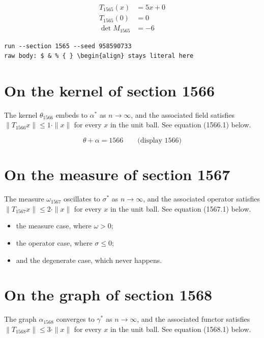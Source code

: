 \documentclass{article}
\begin{document}
\begin{align}
T_{1565}(x) &= 5 x + 0 \\
T_{1565}(0) &= 0 \\
\det M_{1565} &= -6
\end{align}

\begin{verbatim}
run --section 1565 --seed 958590733
raw body: $ & % { } \begin{align} stays literal here
\end{verbatim}

\section{On the kernel of section 1566}
The kernel $\theta_{1566}$ embeds to $\alpha^{*}$ as $n \to \infty$,
and the associated field satisfies $\|T_{1566} x\| \leq 1 \cdot \|x\|$
for every $x$ in the unit ball. See equation (1566.1) below.

$$
\theta + \alpha = 1566 \qquad \text{(display 1566)}
$$

\section{On the measure of section 1567}
The measure $\omega_{1567}$ oscillates to $\sigma^{*}$ as $n \to \infty$,
and the associated operator satisfies $\|T_{1567} x\| \leq 2 \cdot \|x\|$
for every $x$ in the unit ball. See equation (1567.1) below.

\begin{itemize}
  \item the measure case, where $\omega > 0$;
  \item the operator case, where $\sigma \leq 0$;
  \item and the degenerate case, which never happens.
\end{itemize}

\section{On the graph of section 1568}
The graph $\alpha_{1568}$ converges to $\gamma^{*}$ as $n \to \infty$,
and the associated functor satisfies $\|T_{1568} x\| \leq 3 \cdot \|x\|$
for every $x$ in the unit ball. See equation (1568.1) below.
\end{document}
